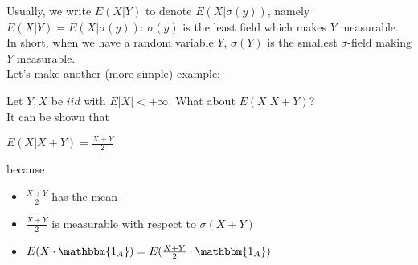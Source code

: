 Usually, we write $E(X|Y)$ to denote $E(X|\sigma(y))$, namely $E(X|Y)=E(X|\sigma(y))$: $\sigma(y)$ is the least field which makes $Y$ measurable.\\
In short, when we have a random variable $Y$, $\sigma(Y)$ is the smallest $\sigma$-field making $Y$ measurable. \\
Let's make another (more simple) example:
\begin{example}
    Let $Y, X$ be $iid$ with $E|X|<+\infty$. What about $E(X|X+Y)$?\\
    It can be shown that 
    \begin{center}
        $E(X | X+Y) = \frac{X+Y}{2}$
    \end{center}
    because
    \begin{itemize}
        \item $\frac{X+Y}{2}$ has the mean
        \item $\frac{X+Y}{2}$ is measurable with respect to $\sigma(X+Y)$
        \item $E(X\cdot\mathbbm{1_A}) = E(\frac{X+Y}{2}\cdot\mathbbm{1_A})$
    \end{itemize}
    
\end{example}









